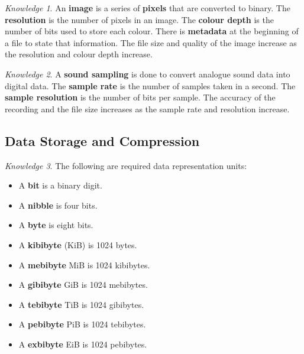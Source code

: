 \documentclass[8pt]{article}
\theoremstyle{remark}
\newtheorem{knowledge}{Knowledge}[subsection]
\begin{document}
        \begin{knowledge}
            An \textbf{image} is a series of \textbf{pixels} that are converted to binary. The \textbf{resolution} is the number of pixels in an image. The \textbf{colour depth} is the number of bits used to store each colour. There is \textbf{metadata} at the beginning of a file to state that information. The file size and quality of the image increase as the resolution and colour depth increase.
        \end{knowledge}

        \begin{knowledge}
            A \textbf{sound sampling} is done to convert analogue sound data into digital data. The \textbf{sample rate} is the number of samples taken in a second. The \textbf{sample resolution} is the number of bits per sample. The accuracy of the recording and the file size increases as the sample rate and resolution increase.
        \end{knowledge}

        \subsection{Data Storage and Compression}

        \begin{knowledge}
            The following are required data representation units:
            \begin{itemize}
                \item A \textbf{bit} is a binary digit.
                \item A \textbf{nibble} is four bits.
                \item A \textbf{byte} is eight bits.
                \item A \textbf{kibibyte} (KiB) is 1024 bytes.
                \item A \textbf{mebibyte} {MiB} is 1024 kibibytes.
                \item A \textbf{gibibyte} {GiB} is 1024 mebibytes.
                \item A \textbf{tebibyte} {TiB} is 1024 gibibytes.
                \item A \textbf{pebibyte} {PiB} is 1024 tebibytes.
                \item A \textbf{exbibyte} {EiB} is 1024 pebibytes.
            \end{itemize}
        \end{knowledge}
\end{document}
